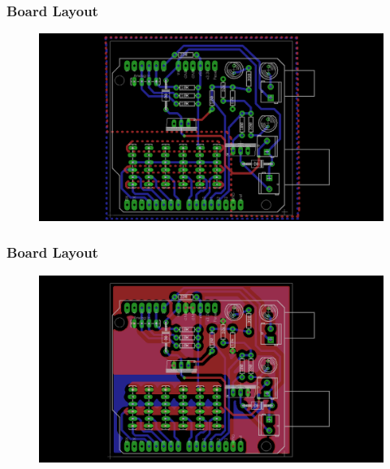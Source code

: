 \documentclass{beamer}
\begin{document}

\begin{frame}
\frametitle{Board Layout}
\begin{figure}
\includegraphics[width=1\linewidth]{boardall.png}
\end{figure}
\end{frame}


\begin{frame}
\frametitle{Board Layout}
\begin{figure}
\includegraphics[width=1\linewidth]{boardfill.png}
\end{figure}
\end{frame}

\end{document}
